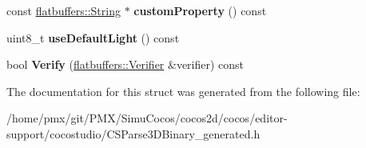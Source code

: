 \begin{DoxyCompactItemize}
const \hyperlink{structflatbuffers_1_1String}{flatbuffers\+::\+String} $\ast$ {\bfseries custom\+Property} () const
\item 
\mbox{\label{structflatbuffers_1_1GameNode3DOption_ac7606ad856611bc893bdf00de701da9f}} 
uint8\+\_\+t {\bfseries use\+Default\+Light} () const
\item 
\mbox{\label{structflatbuffers_1_1GameNode3DOption_a9a8a658ab72b58b38c480a80776a58c8}} 
bool {\bfseries Verify} (\hyperlink{classflatbuffers_1_1Verifier}{flatbuffers\+::\+Verifier} \&verifier) const
\end{DoxyCompactItemize}


The documentation for this struct was generated from the following file\+:\begin{DoxyCompactItemize}
\item 
/home/pmx/git/\+P\+M\+X/\+Simu\+Cocos/cocos2d/cocos/editor-\/support/cocostudio/C\+S\+Parse3\+D\+Binary\+\_\+generated.\+h\end{DoxyCompactItemize}

